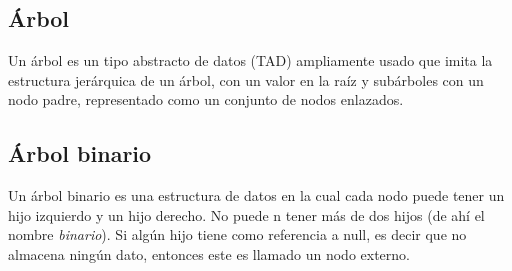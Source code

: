 \subsection{Árbol}
Un árbol es un tipo abstracto de datos (TAD)
 ampliamente usado que imita la estructura jerárquica de un árbol, con un valor en la raíz y subárboles con un nodo padre, representado como un conjunto de nodos enlazados.

\subsection{Árbol binario}
Un árbol binario es una estructura de datos en la cual cada nodo puede tener un hijo izquierdo y un hijo derecho. No puede n tener más de dos hijos (de ahí el nombre \emph{binario}). Si algún hijo tiene como referencia a null, es decir que no almacena ningún dato, entonces este es llamado un nodo externo. 